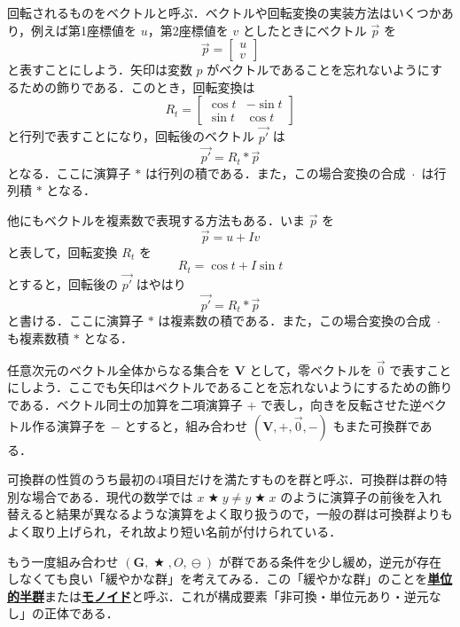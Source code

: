 \documentclass[a4paper,twocolumn]{jsbook}
\newcommand{\keyword}[1]{{\underline{\textbf{#1}}}}
\DeclareMathOperator{\mBinOp}{\bigstar}
\DeclareMathOperator{\mCompRot}{\cdot}
\DeclareMathOperator{\mMinus}{\ominus}
\newcommand{\mSet}[1]{\mathbf{#1}}
\newcommand{\mTupleWith}[1]{\left(#1\right)}
\newcommand{\mVec}[1]{\Vec{#1}}
\begin{document}
回転されるものをベクトルと呼ぶ．ベクトルや回転変換の実装方法はいくつかあり，例えば第1座標値を $u$，第2座標値を $v$ としたときにベクトル $\mVec{p}$ を
\begin{equation}
\mVec{p}=\begin{bmatrix}u\\v\end{bmatrix}
\end{equation}
と表すことにしよう．矢印は変数 $p$ がベクトルであることを忘れないようにするための飾りである．このとき，回転変換は
\begin{equation}
R_t=\begin{bmatrix}\cos t&-\sin t\\\sin t&\cos t\end{bmatrix}
\end{equation}
と行列で表すことになり，回転後のベクトル $\mVec{p'}$ は
\begin{equation}
\mVec{p'}=R_t*\mVec{p}
\end{equation}
となる．ここに演算子 $*$ は行列の積である．また，この場合変換の合成 $\mCompRot$ は行列積 $*$ となる．

他にもベクトルを複素数で表現する方法もある．いま $\mVec{p}$ を
\begin{equation}
\mVec{p}=u+I v
\end{equation}
と表して，回転変換 $R_t$ を
\begin{equation}
R_t=\cos t+I\sin t
\end{equation}
とすると，回転後の $\mVec{p'}$ はやはり
\begin{equation}
\mVec{p'}=R_t*\mVec{p}
\end{equation}
と書ける．ここに演算子 $*$ は複素数の積である．また，この場合変換の合成 $\mCompRot$ も複素数積 $*$ となる．

任意次元のベクトル全体からなる集合を $\mSet{V}$ として，零ベクトルを $\mVec{0}$ で表すことにしよう．ここでも矢印はベクトルであることを忘れないようにするための飾りである．ベクトル同士の加算を二項演算子 $+$ で表し，向きを反転させた逆ベクトル作る演算子を $-$ とすると，組み合わせ $\mTupleWith{\mSet{V},+,\mVec{0},-}$ もまた可換群である．

可換群の性質のうち最初の4項目だけを満たすものを群と呼ぶ．可換群は群の特別な場合である．現代の数学では $x\mBinOp y\neq y\mBinOp x$ のように演算子の前後を入れ替えると結果が異なるような演算をよく取り扱うので，一般の群は可換群よりもよく取り上げられ，それ故より短い名前が付けられている．

もう一度組み合わせ $\mTupleWith{\mSet{G},\mBinOp,O,\mMinus}$ が群である条件を少し緩め，逆元が存在しなくても良い「緩やかな群」を考えてみる．この「緩やかな群」のことを\keyword{単位的半群}または\keyword{モノイド}と呼ぶ．これが構成要素「非可換・単位元あり・逆元なし」の正体である．
\end{document}
